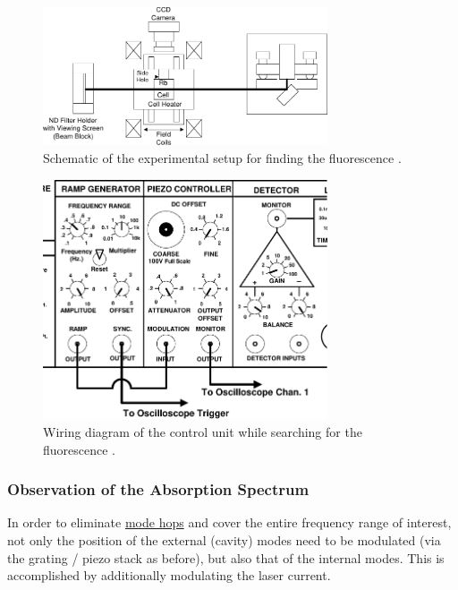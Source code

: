 \begin{figure}
    \centering
    \includegraphics[width=0.75\textwidth]{content/img/p33_Fig4.pdf}
    \caption{Schematic of the experimental setup for finding the  fluorescence \cite{versuchsanleitung}.}
    \label{fig:schematic2}
\end{figure}

\begin{figure}
    \centering
    \includegraphics[width=0.75\textwidth]{content/img/p34_Fig5.pdf}
    \caption{Wiring diagram of the control unit while searching for the  fluorescence \cite{versuchsanleitung}.}
    \label{fig:wiring2}
\end{figure}


\subsubsection{Observation of the Absorption Spectrum}

In order to eliminate \hyperref[sec:theorie:modehops]{mode hops} and cover the entire frequency range of interest,
not only the position of the external (cavity) modes need to be modulated (via the grating / piezo stack as before),
but also that of the internal modes.
This is accomplished by additionally modulating the laser current.

